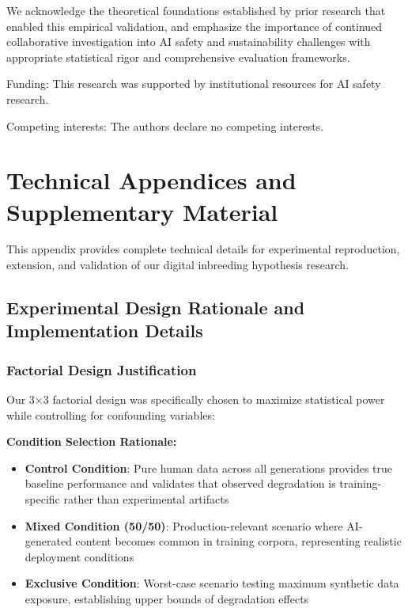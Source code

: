 \documentclass{article}
\begin{document}
\begin{ack}
We acknowledge the theoretical foundations established by prior research that enabled this empirical validation, and emphasize the importance of continued collaborative investigation into AI safety and sustainability challenges with appropriate statistical rigor and comprehensive evaluation frameworks.

Funding: This research was supported by institutional resources for AI safety research.

Competing interests: The authors declare no competing interests.
\end{ack}




\appendix

\section{Technical Appendices and Supplementary Material}

This appendix provides complete technical details for experimental reproduction, extension, and validation of our digital inbreeding hypothesis research.

\subsection{Experimental Design Rationale and Implementation Details}
\label{appendix:experimental_design}

\subsubsection{Factorial Design Justification}

Our 3×3 factorial design was specifically chosen to maximize statistical power while controlling for confounding variables:

\textbf{Condition Selection Rationale:}
\begin{itemize}
    \item \textbf{Control Condition}: Pure human data across all generations provides true baseline performance and validates that observed degradation is training-specific rather than experimental artifacts
    \item \textbf{Mixed Condition (50/50)}: Production-relevant scenario where AI-generated content becomes common in training corpora, representing realistic deployment conditions
    \item \textbf{Exclusive Condition}: Worst-case scenario testing maximum synthetic data exposure, establishing upper bounds of degradation effects
\end{itemize}
\end{document}
